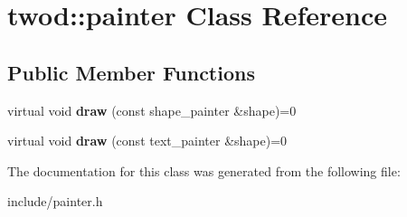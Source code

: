 \hypertarget{classtwod_1_1painter}{}\section{twod\+:\+:painter Class Reference}
\label{classtwod_1_1painter}
\subsection*{Public Member Functions}
\begin{DoxyCompactItemize}
\item 
\mbox{\label{classtwod_1_1painter_a757630bcfa805ad2df203a3f3e63ba68}} 
virtual void {\bfseries draw} (const shape\+\_\+painter \&shape)=0
\item 
\mbox{\label{classtwod_1_1painter_aaf769250930bcb23505da23003c0bb46}} 
virtual void {\bfseries draw} (const text\+\_\+painter \&shape)=0
\end{DoxyCompactItemize}


The documentation for this class was generated from the following file\+:\begin{DoxyCompactItemize}
\item 
include/painter.\+h\end{DoxyCompactItemize}
